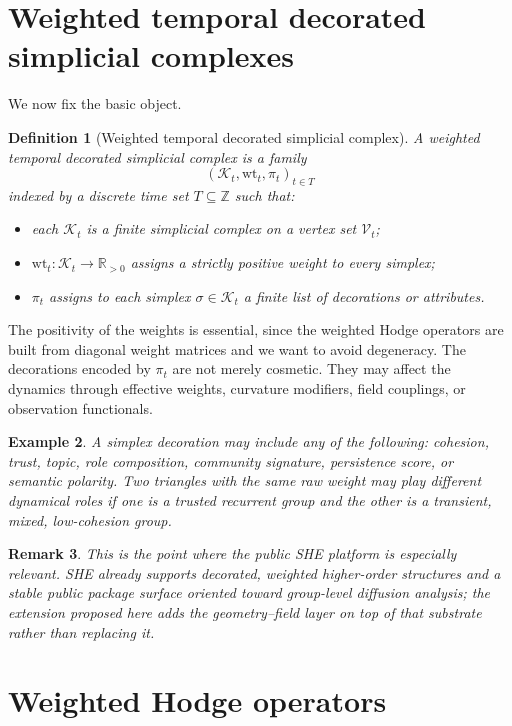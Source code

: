 \documentclass[11pt]{article}
\newtheorem{definition}{Definition}[section]
\newtheorem{remark}[definition]{Remark}
\newtheorem{example}[definition]{Example}
\newcommand{\R}{\mathbb{R}}
\newcommand{\K}{\mathcal{K}}
\newcommand{\V}{\mathcal{V}}
\newcommand{\wt}{\mathrm{wt}}
\begin{document}
\section{Weighted temporal decorated simplicial complexes}

We now fix the basic object.

\begin{definition}[Weighted temporal decorated simplicial complex]
A \emph{weighted temporal decorated simplicial complex} is a family
\[
(\K_t,\wt_t,\pi_t)_{t\in T}
\]
indexed by a discrete time set $T\subseteq \mathbb{Z}$ such that:
\begin{itemize}
    \item each $\K_t$ is a finite simplicial complex on a vertex set $\V_t$;
    \item $\wt_t:\K_t\to \R_{>0}$ assigns a strictly positive weight to every simplex;
    \item $\pi_t$ assigns to each simplex $\sigma\in\K_t$ a finite list of decorations or attributes.
\end{itemize}
\end{definition}

The positivity of the weights is essential, since the weighted Hodge operators are built from diagonal weight matrices and we want to avoid degeneracy. The decorations encoded by $\pi_t$ are not merely cosmetic. They may affect the dynamics through effective weights, curvature modifiers, field couplings, or observation functionals.

\begin{example}
A simplex decoration may include any of the following: cohesion, trust, topic, role composition, community signature, persistence score, or semantic polarity. Two triangles with the same raw weight may play different dynamical roles if one is a trusted recurrent group and the other is a transient, mixed, low-cohesion group.
\end{example}

\begin{remark}
This is the point where the public SHE platform is especially relevant. SHE already supports decorated, weighted higher-order structures and a stable public package surface oriented toward group-level diffusion analysis; the extension proposed here adds the geometry--field layer on top of that substrate rather than replacing it.
\end{remark}

\section{Weighted Hodge operators}
\end{document}
